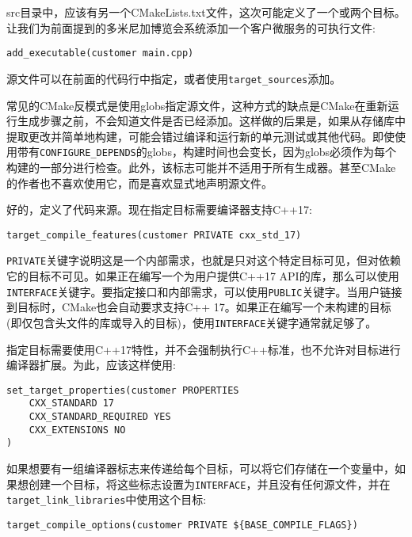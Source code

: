 src目录中，应该有另一个CMakeLists.txt文件，这次可能定义了一个或两个目标。让我们为前面提到的多米尼加博览会系统添加一个客户微服务的可执行文件:

\begin{lstlisting}[style=styleCMake]
add_executable(customer main.cpp)
\end{lstlisting}

源文件可以在前面的代码行中指定，或者使用\texttt{target\_sources}添加。

常见的CMake反模式是使用globs指定源文件，这种方式的缺点是CMake在重新运行生成步骤之前，不会知道文件是否已经添加。这样做的后果是，如果从存储库中提取更改并简单地构建，可能会错过编译和运行新的单元测试或其他代码。即使使用带有\texttt{CONFIGURE\_DEPENDS}的globs，构建时间也会变长，因为globs必须作为每个构建的一部分进行检查。此外，该标志可能并不适用于所有生成器。甚至CMake的作者也不喜欢使用它，而是喜欢显式地声明源文件。

好的，定义了代码来源。现在指定目标需要编译器支持C++17:

\begin{lstlisting}[style=styleCMake]
target_compile_features(customer PRIVATE cxx_std_17)
\end{lstlisting}

\texttt{PRIVATE}关键字说明这是一个内部需求，也就是只对这个特定目标可见，但对依赖它的目标不可见。如果正在编写一个为用户提供C++17 API的库，那么可以使用\texttt{INTERFACE}关键字。要指定接口和内部需求，可以使用\texttt{PUBLIC}关键字。当用户链接到目标时，CMake也会自动要求支持C++ 17。如果正在编写一个未构建的目标(即仅包含头文件的库或导入的目标)，使用\texttt{INTERFACE}关键字通常就足够了。

指定目标需要使用C++17特性，并不会强制执行C++标准，也不允许对目标进行编译器扩展。为此，应该这样使用:

\begin{lstlisting}[style=styleCMake]
set_target_properties(customer PROPERTIES
	CXX_STANDARD 17
	CXX_STANDARD_REQUIRED YES
	CXX_EXTENSIONS NO
)
\end{lstlisting}

如果想要有一组编译器标志来传递给每个目标，可以将它们存储在一个变量中，如果想创建一个目标，将这些标志设置为\texttt{INTERFACE}，并且没有任何源文件，并在\texttt{target\_link\_libraries}中使用这个目标:

\begin{lstlisting}[style=styleCMake]
target_compile_options(customer PRIVATE ${BASE_COMPILE_FLAGS})
\end{lstlisting}

